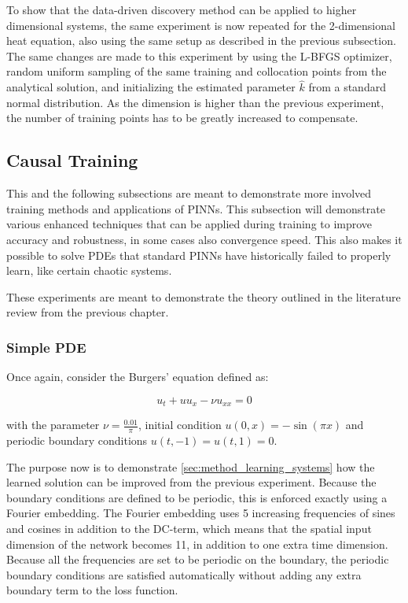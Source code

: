 To show that the data-driven discovery method can be applied to higher dimensional systems, the same experiment is now repeated for the 2-dimensional heat equation, also using the same setup as described in the previous subsection. The same changes are made to this experiment by using the L-BFGS optimizer, random uniform sampling of the same training and collocation points from the analytical solution, and initializing the estimated parameter $\hat{k}$ from a standard normal distribution. As the dimension is higher than the previous experiment, the number of training points has to be greatly increased to compensate.

\subsection{Causal Training}

This and the following subsections are meant to demonstrate more involved training methods and applications of PINNs. This subsection will demonstrate various enhanced techniques that can be applied during training to improve accuracy and robustness, in some cases also convergence speed. This also makes it possible to solve PDEs that standard PINNs have historically failed to properly learn, like certain chaotic systems.

These experiments are meant to demonstrate the theory outlined in the literature review from the previous chapter.

\subsubsection{Simple PDE}

Once again, consider the Burgers' equation defined as:

\begin{equation}
    u_t + u u_x - \nu u_{xx} = 0
\end{equation}

\noindent with the parameter $\nu = \frac{0.01}{\pi}$, initial condition $u(0, x) = - \sin(\pi x)$ and periodic boundary conditions $u(t, -1) = u(t, 1) = 0$.

The purpose now is to demonstrate \ref{sec:method_learning_systems} how the learned solution can be improved from the previous experiment. Because the boundary conditions are defined to be periodic, this is enforced exactly using a Fourier embedding. The Fourier embedding uses 5 increasing frequencies of sines and cosines in addition to the DC-term, which means that the spatial input dimension of the network becomes 11, in addition to one extra time dimension. Because all the frequencies are set to be periodic on the boundary, the periodic boundary conditions are satisfied automatically without adding any extra boundary term to the loss function.

